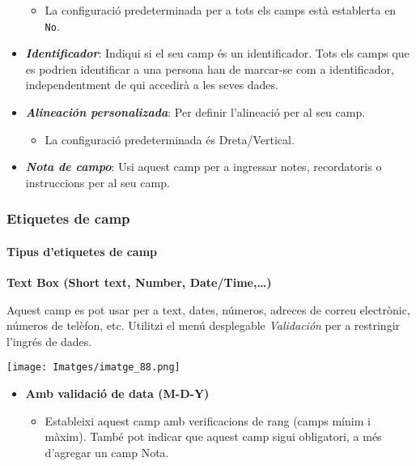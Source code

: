 \documentclass[
]{article}
\providecommand{\tightlist}{%
  \setlength{\itemsep}{0pt}\setlength{\parskip}{0pt}}
\begin{document}
\begin{itemize}
  \begin{itemize}
  \tightlist
  \item
    La configuració predeterminada per a tots els camps està establerta en \texttt{No}.
  \end{itemize}
\item
  \textbf{\emph{Identificador}}: Indiqui si el seu camp és un identificador. Tots els camps que es podrien identificar a una persona han de marcar-se com a identificador, independentment de qui accedirà a les seves dades.
\item
  \textbf{\emph{Alineación personalizada}}: Per definir l'alineació per al seu camp.

  \begin{itemize}
  \tightlist
  \item
    La configuració predeterminada és Dreta/Vertical.
  \end{itemize}
\item
  \textbf{\emph{Nota de campo}}: Usi aquest camp per a ingressar notes, recordatoris o instruccions per al seu camp.
\end{itemize}

\hypertarget{etiquetes-de-camp}{%
\subsubsection{\texorpdfstring{\textbf{Etiquetes de camp}}{Etiquetes de camp}}\label{etiquetes-de-camp}}

\hypertarget{tipus-detiquetes-de-camp}{%
\paragraph{Tipus d'etiquetes de camp}\label{tipus-detiquetes-de-camp}}

\textbf{Text Box (Short text, Number, Date/Time,\ldots)}

Aquest camp es pot usar per a text, dates, números, adreces de correu electrònic, números de telèfon, etc. Utilitzi el menú desplegable \emph{Validación} per a restringir l'ingrés de dades.

\texttt{[image: Imatges/imatge\_88.png]}

\begin{itemize}
\tightlist
\item
  \textbf{Amb validació de data (M-D-Y)}

  \begin{itemize}
  \tightlist
  \item
    Estableixi aquest camp amb verificacions de rang (camps mínim i màxim). També pot indicar que aquest camp sigui obligatori, a més d'agregar un camp Nota.
  \end{itemize}
\end{itemize}
\end{document}
